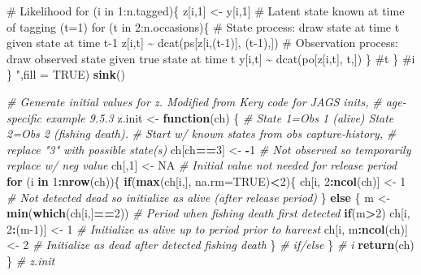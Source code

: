 \documentclass[
]{krantz}
\makeatletter
\newenvironment{Shaded}{\begin{snugshade}}{\end{snugshade}}
\newcommand{\AttributeTok}[1]{\textcolor[rgb]{0.27,0.27,0.27}{#1}}
\newcommand{\CommentTok}[1]{\textcolor[rgb]{0.37,0.37,0.37}{\textit{#1}}}
\newcommand{\ConstantTok}[1]{\textcolor[rgb]{0.37,0.37,0.37}{#1}}
\newcommand{\ControlFlowTok}[1]{\textcolor[rgb]{0.27,0.27,0.27}{\textbf{#1}}}
\newcommand{\DecValTok}[1]{\textcolor[rgb]{0.06,0.06,0.06}{#1}}
\newcommand{\FunctionTok}[1]{\textcolor[rgb]{0.27,0.27,0.27}{\textbf{#1}}}
\newcommand{\NormalTok}[1]{#1}
\newcommand{\OtherTok}[1]{\textcolor[rgb]{0.37,0.37,0.37}{#1}}
\newcommand{\SpecialCharTok}[1]{\textcolor[rgb]{0.43,0.43,0.43}{\textbf{#1}}}
\newcommand{\StringTok}[1]{\textcolor[rgb]{0.5,0.5,0.5}{#1}}
\newenvironment{kframe}{%
\medskip{}
\setlength{\fboxsep}{.8em}
 \def\at@end@of@kframe{}%
 \ifinner\ifhmode%
  \def\at@end@of@kframe{\end{minipage}}%
  \begin{minipage}{\columnwidth}%
 \fi\fi%
 \def\FrameCommand##1{\hskip\@totalleftmargin \hskip-\fboxsep
 \colorbox{shadecolor}{##1}\hskip-\fboxsep
     \hskip-\linewidth \hskip-\@totalleftmargin \hskip\columnwidth}%
 \MakeFramed {\advance\hsize-\width
   \@totalleftmargin\z@ \linewidth\hsize
   \@setminipage}}%
 {\par\unskip\endMakeFramed%
 \at@end@of@kframe}
\renewenvironment{Shaded}{\begin{kframe}}{\end{kframe}}
\makeatother
\begin{document}
\begin{Shaded}
\begin{Highlighting}[]
\StringTok{    \# Likelihood}
\StringTok{    for (i in 1:n.tagged)\{}
\StringTok{    z[i,1] \textless{}{-} y[i,1] \# Latent state known at time of tagging (t=1)}
\StringTok{    for (t in 2:n.occasions)\{}
\StringTok{    \# State process: draw state at time t given state at time t{-}1}
\StringTok{    z[i,t] \textasciitilde{} dcat(ps[z[i,(t{-}1)], (t{-}1),])}
\StringTok{    \# Observation process: draw observed state given true state at time t}
\StringTok{    y[i,t] \textasciitilde{} dcat(po[z[i,t], t,])}
\StringTok{    \} \#t}
\StringTok{    \} \#i}
\StringTok{\}}
\StringTok{    "}\NormalTok{,}\AttributeTok{fill =} \ConstantTok{TRUE}\NormalTok{)}
\FunctionTok{sink}\NormalTok{()}

\CommentTok{\# Generate initial values for z. Modified from Kery code for JAGS inits,}
\CommentTok{\# age{-}specific example 9.5.3}
\NormalTok{z.init }\OtherTok{\textless{}{-}} \ControlFlowTok{function}\NormalTok{(ch) \{}
  \CommentTok{\# State 1=Obs 1 (alive) State 2=Obs 2 (fishing death). }
  \CommentTok{\# Start w/ known states from obs capture{-}history,}
  \CommentTok{\# replace "3" with possible state(s)}
\NormalTok{  ch[ch}\SpecialCharTok{==}\DecValTok{3}\NormalTok{] }\OtherTok{\textless{}{-}} \SpecialCharTok{{-}}\DecValTok{1}  \CommentTok{\# Not observed so temporarily replace w/ neg value}
\NormalTok{  ch[,}\DecValTok{1}\NormalTok{] }\OtherTok{\textless{}{-}} \ConstantTok{NA}  \CommentTok{\# Initial value not needed for release period}
  \ControlFlowTok{for}\NormalTok{ (i }\ControlFlowTok{in} \DecValTok{1}\SpecialCharTok{:}\FunctionTok{nrow}\NormalTok{(ch))\{}
    \ControlFlowTok{if}\NormalTok{(}\FunctionTok{max}\NormalTok{(ch[i,], }\AttributeTok{na.rm=}\ConstantTok{TRUE}\NormalTok{)}\SpecialCharTok{\textless{}}\DecValTok{2}\NormalTok{)\{}
\NormalTok{      ch[i, }\DecValTok{2}\SpecialCharTok{:}\FunctionTok{ncol}\NormalTok{(ch)] }\OtherTok{\textless{}{-}} \DecValTok{1} 
      \CommentTok{\# Not detected dead so initialize as alive (after release period)}
\NormalTok{      \} }\ControlFlowTok{else}\NormalTok{ \{}
\NormalTok{      m }\OtherTok{\textless{}{-}} \FunctionTok{min}\NormalTok{(}\FunctionTok{which}\NormalTok{(ch[i,]}\SpecialCharTok{==}\DecValTok{2}\NormalTok{))  }\CommentTok{\# Period when fishing death first detected}
      \ControlFlowTok{if}\NormalTok{(m}\SpecialCharTok{\textgreater{}}\DecValTok{2}\NormalTok{) ch[i, }\DecValTok{2}\SpecialCharTok{:}\NormalTok{(m}\DecValTok{{-}1}\NormalTok{)] }\OtherTok{\textless{}{-}} \DecValTok{1}  
      \CommentTok{\# Initialize as alive up to period prior to harvest}
\NormalTok{      ch[i, m}\SpecialCharTok{:}\FunctionTok{ncol}\NormalTok{(ch)] }\OtherTok{\textless{}{-}} \DecValTok{2}  \CommentTok{\# Initialize as dead after detected fishing death}
\NormalTok{      \} }\CommentTok{\# if/else}
\NormalTok{\} }\CommentTok{\# i}
  \FunctionTok{return}\NormalTok{(ch)}
\NormalTok{\} }\CommentTok{\# z.init}


\end{Highlighting}
\end{Shaded}
\end{document}
